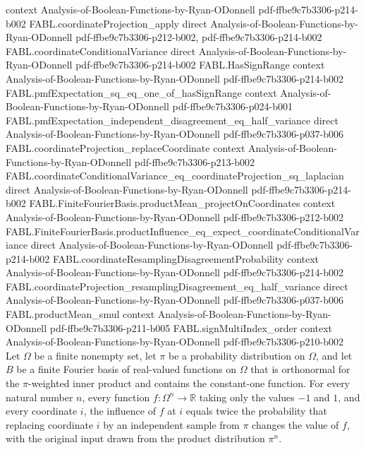 \begin{theorem}
  {context}
  {Analysis-of-Boolean-Functions-by-Ryan-ODonnell}
  {pdf-ffbe9c7b3306-p214-b002}
\proofstep
  {FABL.coordinateProjection_apply}
  {direct}
  {Analysis-of-Boolean-Functions-by-Ryan-ODonnell}
  {pdf-ffbe9c7b3306-p212-b002,
    pdf-ffbe9c7b3306-p214-b002}
\proofstep
  {FABL.coordinateConditionalVariance}
  {direct}
  {Analysis-of-Boolean-Functions-by-Ryan-ODonnell}
  {pdf-ffbe9c7b3306-p214-b002}
\proofstep
  {FABL.HasSignRange}
  {context}
  {Analysis-of-Boolean-Functions-by-Ryan-ODonnell}
  {pdf-ffbe9c7b3306-p214-b002}
\proofstep
  {FABL.pmfExpectation_sq_eq_one_of_hasSignRange}
  {context}
  {Analysis-of-Boolean-Functions-by-Ryan-ODonnell}
  {pdf-ffbe9c7b3306-p024-b001}
\proofstep
  {FABL.pmfExpectation_independent_disagreement_eq_half_variance}
  {direct}
  {Analysis-of-Boolean-Functions-by-Ryan-ODonnell}
  {pdf-ffbe9c7b3306-p037-b006}
\proofstep
  {FABL.coordinateProjection_replaceCoordinate}
  {context}
  {Analysis-of-Boolean-Functions-by-Ryan-ODonnell}
  {pdf-ffbe9c7b3306-p213-b002}
\proofstep
  {FABL.coordinateConditionalVariance_eq_coordinateProjection_sq_laplacian}
  {direct}
  {Analysis-of-Boolean-Functions-by-Ryan-ODonnell}
  {pdf-ffbe9c7b3306-p214-b002}
\proofstep
  {FABL.FiniteFourierBasis.productMean_projectOnCoordinates}
  {context}
  {Analysis-of-Boolean-Functions-by-Ryan-ODonnell}
  {pdf-ffbe9c7b3306-p212-b002}
\proofstep
  {FABL.FiniteFourierBasis.productInfluence_eq_expect_coordinateConditionalVariance}
  {direct}
  {Analysis-of-Boolean-Functions-by-Ryan-ODonnell}
  {pdf-ffbe9c7b3306-p214-b002}
\proofstep
  {FABL.coordinateResamplingDisagreementProbability}
  {context}
  {Analysis-of-Boolean-Functions-by-Ryan-ODonnell}
  {pdf-ffbe9c7b3306-p214-b002}
\proofstep
  {FABL.coordinateProjection_resamplingDisagreement_eq_half_variance}
  {direct}
  {Analysis-of-Boolean-Functions-by-Ryan-ODonnell}
  {pdf-ffbe9c7b3306-p037-b006}
\proofstep
  {FABL.productMean_smul}
  {context}
  {Analysis-of-Boolean-Functions-by-Ryan-ODonnell}
  {pdf-ffbe9c7b3306-p211-b005}
\proofstep
  {FABL.signMultiIndex_order}
  {context}
  {Analysis-of-Boolean-Functions-by-Ryan-ODonnell}
  {pdf-ffbe9c7b3306-p210-b002}
Let $\Omega$ be a finite nonempty set, let $\pi$ be a probability distribution on
$\Omega$, and let $B$ be a finite Fourier basis of real-valued functions on $\Omega$
that is orthonormal for the $\pi$-weighted inner product and contains the constant-one
function. For every natural number $n$, every function $f:\Omega^n\to\mathbb R$ taking
only the values $-1$ and $1$, and every coordinate $i$, the influence of $f$ at $i$
equals twice the probability that replacing coordinate $i$ by an independent sample from
$\pi$ changes the value of $f$, with the original input drawn from the product
distribution $\pi^n$.
\end{theorem}

